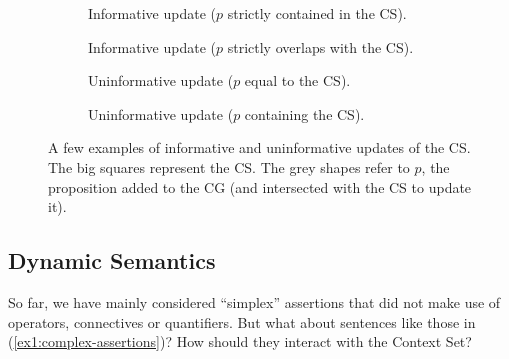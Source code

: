 \begin{figure}[H]
	\centering
	\begin{subfigure}[b]{.23\linewidth}
		\centering
		\caption{Informative update ($p$ strictly contained in the CS).}\label{fig1:contained-update}
	\end{subfigure}\hfill
	\begin{subfigure}[b]{.23\linewidth}
		\centering
		\caption{Informative update ($p$ strictly overlaps with the CS).}\label{fig1:informative-update}
	\end{subfigure}\hfill
	\begin{subfigure}[b]{.23\linewidth}
		\centering
		\caption{Uninformative update ($p$ equal to the CS).}\label{fig1:uninformative-equal-update}
	\end{subfigure}\hfill
	\begin{subfigure}[b]{.23\linewidth}
		\centering
		\caption{Uninformative update ($p$ containing the CS).}\label{fig1:uninformative-update}
	\end{subfigure}
	\caption{A few examples of informative and uninformative updates of the CS. The big squares represent the CS. The grey shapes refer to $p$, the proposition added to the CG (and intersected with the CS to update it).}\label{fig1:informative-assertions}
\end{figure}

\subsection{Dynamic Semantics}

So far, we have mainly considered ``simplex'' assertions that did not make use of operators, connectives or quantifiers. But what about sentences like those in (\ref{ex1:complex-assertions})? How should they interact with the Context Set?
\begin{exe}
	\ex \label{ex1:complex-assertions}
	\begin{xlist}
	\end{xlist}
\end{exe}

